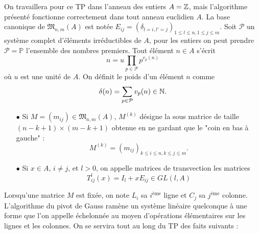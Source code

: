 On travaillera pour ce TP dans l'anneau des entiers $A=\mathbb Z$, mais l'algorithme présenté fonctionne correctement dans tout anneau euclidien $A$. La base canonique de $\mathfrak M_{n,m}(A)$ est notée $E_{ij}=(\delta_{l=i,l'=j})_{1\leq l\leq n,1\leq j\leq m}$. Soit $\mathcal P$ un système complet d'éléments irréductibles de $A$, pour les entiers on peut prendre $\mathcal P=\mathbb P$ l'ensemble des nombres premiers. Tout élément $n\in A$ s'écrit 
\[n=u\prod_{p\in\mathcal P} p^{v_p(n)}\]
où $u$ est une unité de $A$. On définit le poids d'un élément $n$ comme
\[\delta(n)=\sum_{p\in\mathcal P} v_p(n) \in \mathbb N.\]

\begin{itemize}
\item[$\bullet$] Si $M=(m_{ij})\in \mathfrak M_{n,m}(A)$, $M^{(k)}$ désigne la sous matrice de taille $(n-k+1)\times (m-k+1) $ obtenue en ne gardant que le "coin en bas à gauche" :
\[M^{(k)}=(m_{ij})_{k\leq i\leq n,k\leq j\leq m}.\]
\item[$\bullet$] Si $x\in A$, $i\neq j$, et $l>0$, on appelle matrices de transvection les matrices 
\[T_{ij}^l(x)=I_l + xE_{ij}\in GL(l,A)\]
\end{itemize}

Lorsqu'une matrice $M$ est fixée, on note $L_i$ sa $i^{\text{ème}}$ ligne et $C_j$ sa $j^{\text{ème}}$ colonne. L'algorithme du pivot de Gauss ramène un système linéaire quelconque à une forme que l'on appelle échelonnée au moyen d'opérations élémentaires sur les lignes et les colonnes. On se servira tout au long du TP des faits suivants : \\

